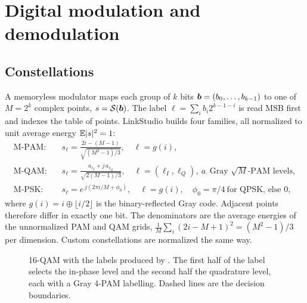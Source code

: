 \chapter{Digital modulation and demodulation}\label{ch:modulation}

\section{Constellations}
A memoryless modulator maps each group of $k$ bits $\bm{b}=(b_0,\dots,b_{k-1})$ to one of
$M=2^k$ complex points, $s=\mathcal{S}(\bm{b})$. The label $\ell=\sum_i b_i2^{k-1-i}$ is
read MSB first and indexes the table of points. LinkStudio builds four families, all normalized to
unit average energy $\mathbb{E}|s|^2=1$:
\begin{align}
  \text{M-PAM:}\quad & s_\ell = \frac{2i-(M-1)}{\sqrt{(M^2-1)/3}},\quad \ell=g(i),\\
  \text{M-QAM:}\quad & s_\ell = \frac{a_{\ell_I}+j\,a_{\ell_Q}}{\sqrt{2(M-1)/3}},\quad
     \ell=(\ell_I,\ell_Q),\ a_\cdot\ \text{Gray }\sqrt M\text{-PAM levels},\\
  \text{M-PSK:}\quad & s_\ell = e^{\,j(2\pi i/M+\phi_0)},\quad \ell=g(i),\quad
     \phi_0=\pi/4\ \text{for QPSK, else }0,
\end{align}
where $g(i)=i\oplus\lfloor i/2\rfloor$ is the binary-reflected Gray code. Adjacent points
therefore differ in exactly one bit. The denominators are the average energies of the
unnormalized PAM and QAM grids, $\frac1M\sum_i(2i-M+1)^2=(M^2-1)/3$ per dimension. Custom
constellations are normalized the same way.

\begin{figure}[htbp]
\centering
{}
\caption{16-QAM with the labels produced by . The first half of the label selects
the in-phase level and the second half the quadrature level, each with a Gray 4-PAM labelling.
Dashed lines are the decision boundaries.}
\label{fig:qam16}
\end{figure}

